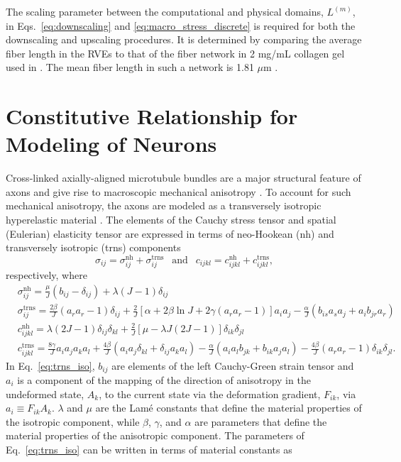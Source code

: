 \documentclass[]{interact}
\begin{document}
The scaling parameter between the computational and physical domains, $L^{(m)}$, in Eqs.\ \eqref{eq:downscaling} and \eqref{eq:macro_stress_discrete} is required for both the downscaling and upscaling procedures. It is determined by comparing the average fiber length in the RVEs to that of the fiber network in 2 mg/mL collagen gel used in \citep{Zhang:2016ga}. The mean fiber length in such a network is 1.81 $\mu$m \citep{Lindstrom:2013gd}.

\section{Constitutive Relationship for Modeling of Neurons}
Cross-linked axially-aligned microtubule bundles are a major structural feature of axons and give rise to macroscopic mechanical anisotropy \citep{Peter:2012fc}. To account for such mechanical anisotropy, the axons are modeled as a transversely isotropic hyperelastic material \citep{JavierBonet:2008uxa,Bonet:1998vc}. The elements of the Cauchy stress tensor and spatial (Eulerian) elasticity tensor are expressed in terms of neo-Hookean (nh) and transversely isotropic (trns) components \citep{Bonet:1998vc}
%
\begin{equation}
\sigma_{ij} = \sigma^{\text{nh}}_{ij} + \sigma^{\text{trns}}_{ij} \ \ \text{ and } \ \ c_{ijkl} = c^{\text{nh}}_{ijkl} + c^{\text{trns}}_{ijkl},
\end{equation}
%
respectively, where 
%
\begin{align}
&\sigma^{\text{nh}}_{ij} = \frac{\mu}{J}(b_{ij} - \delta_{ij}) + \lambda(J-1)\delta_{ij} \nonumber\\
%
&\sigma^{\text{trns}}_{ij} = \frac{2\beta}{J}(a_r a_r - 1)\delta_{ij} + \frac{2}{J}[\alpha+2\beta\ln J+2\gamma(a_r a_r -1)]a_i a_j - \frac{\alpha}{J}(b_{is}a_s a_j+a_i b_{jr}a_r) \nonumber\\
%
&c^{\text{nh}}_{ijkl} = \lambda(2J-1)\delta_{ij}\delta_{kl} + \frac{2}{J}[\mu - \lambda J(2J-1)]\delta_{ik}\delta_{jl} \nonumber\\
%
&c^{\text{trns}}_{ijkl} = \frac{8\gamma}{J}a_i a_j a_k a_l + \frac{4\beta}{J}(a_i a_j \delta_{kl} + \delta_{ij}a_k a_l) - \frac{\alpha}{J}(a_i a_l b_{jk} + b_{ik}a_j a_l) - \frac{4\beta}{J}(a_r a_r - 1)\delta_{ik}\delta_{jl}.
\label{eq:trns_iso}
\end{align}
%
In Eq.\ \eqref{eq:trns_iso}, $b_{ij}$ are elements of the left Cauchy-Green strain tensor and $a_i$ is a component of the mapping of the direction of anisotropy in the undeformed state, $A_k$, to the current state via the deformation gradient, $F_{ik}$, via $a_i \equiv F_{ik}A_k$. $\lambda$ and $\mu$ are the Lam\'e constants that define the material properties of the isotropic component, while $\beta$, $\gamma$, and $\alpha$ are parameters that define the material properties of the anisotropic component. The parameters of Eq.\ \eqref{eq:trns_iso} can be written in terms of material constants as
\end{document}
